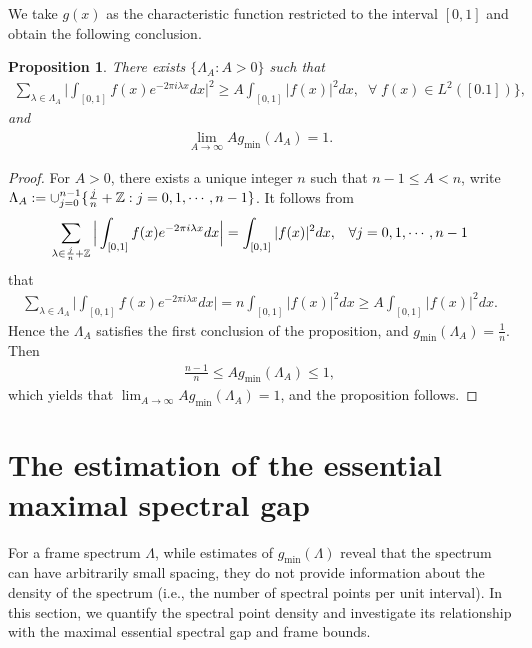 \documentclass[12pt,psfig,reqno]{amsart}
\numberwithin{equation}{section}
\theoremstyle{plain}
\newtheorem{prop}[thm]{Proposition}
\begin{document}
We take $g(x)$ as the characteristic function restricted to the interval $[0,1]$ and obtain the following conclusion.
\begin{prop}\label{thm2.1}
	There exists $\{\Lambda_A:A>0\}$ such that 	\begin{align*}
		\sum_{\lambda\in\Lambda_A}\Big|\int_{[0,1]} f(x)e^{-2\pi i\lambda x}dx\Big|^2\geq A\int_{[0,1]}|f(x)|^2dx,\;\;\forall\;f(x)\in L^2([0.1])\}, 
	\end{align*}
	and 
	\begin{align*}
		\lim_{A\rightarrow\infty}Ag_{\min}(\Lambda_A)=1.
	\end{align*}
\end{prop}
\begin{proof}
	For $A>0$, there exists a unique integer $n$ such that $n-1\leq A<n$, write $\Lambda_A:=\cup_{j=0}^{n-1}\{\frac{j}{n}+\Bbb Z:j=0,1,\cdots,n-1\}$. 
	It follows from 
\begin{align*}
	\sum_{\lambda\in\frac{j}{n}+\Bbb Z}\Big|\int_{[0,1]} f(x)e^{-2\pi i\lambda x}dx\Big|=\int_{[0,1]}|f(x)|^2dx,\;\;\;\forall j=0,1,\cdots,n-1
\end{align*} 
that 
\begin{align*}
	\sum_{\lambda\in\Lambda_A}\Big|\int_{[0,1]} f(x)e^{-2\pi i\lambda x}dx\Big|=n\int_{[0,1]}|f(x)|^2dx\geq A\int_{[0,1]}|f(x)|^2dx.
\end{align*}
Hence the $\Lambda_A$ satisfies the first conclusion of the proposition, and 
$g_{\min}(\Lambda_A)=\frac1n$. 
Then 
	\begin{align*}
\frac{n-1}{n}\leq Ag_{\min}(\Lambda_A)\leq 1, 
\end{align*}
which yields that $\lim_{A\rightarrow\infty}Ag_{\min}(\Lambda_A)=1$, and the proposition follows. 
\end{proof}
\section{The estimation of the essential maximal spectral gap}
For a frame spectrum \(\Lambda\), while estimates of \( g_{\min}(\Lambda) \) reveal that the spectrum can have arbitrarily small spacing, they do not provide information about the density of the spectrum (i.e., the number of spectral points per unit interval). In this section, we quantify the spectral point density and investigate its relationship with the maximal essential spectral gap and frame bounds.
\end{document}
